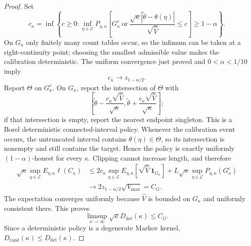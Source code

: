 \documentclass{article}
\begin{document}
\begin{proof}
Set
\[
 c_\kappa=\inf\left\{c\geq0:
  \inf_{\eta\in\mathcal E}P_{\eta,\kappa}\left[
   G_\kappa^c\ \text{or}\
   \frac{\sqrt\kappa|\widetilde\theta-\theta(\eta)|}{\sqrt{\widehat V}}
       \leq c
  \right]\geq1-\alpha
 \right\}.
\]
On \(G_\kappa\) only finitely many count tables occur, so the infimum can
be taken at a right-continuity point; choosing the smallest admissible
value makes the calibration deterministic.  The uniform convergence just
proved and \(0<\alpha<1/10\) imply
\[
 c_\kappa\longrightarrow z_{1-\alpha/2}.
\]
Report \(\Theta\) on \(G_\kappa^c\).  On \(G_\kappa\), report the
intersection of \(\Theta\) with
\[
 \left[\widetilde\theta-\frac{c_\kappa\sqrt{\widehat V}}{\sqrt\kappa},
       \widetilde\theta+\frac{c_\kappa\sqrt{\widehat V}}{\sqrt\kappa}
 \right];
\]
if that intersection is empty, report the nearest endpoint singleton.
This is a Borel deterministic connected-interval policy.  Whenever the
calibration event occurs, the untruncated interval contains
\(\theta(\eta)\in\Theta\), so its intersection is nonempty and still
contains the target.  Hence the policy is exactly uniformly
\((1-\alpha)\)-honest for every \(\kappa\).  Clipping cannot increase
length, and therefore
\[
 \begin{split}
 \sqrt\kappa\sup_{\eta\in\mathcal E}
 E_{\eta,\kappa}\ell(C_\kappa)
 &\leq
 2c_\kappa\sup_{\eta\in\mathcal E}
 E_{\eta,\kappa}\left[\sqrt{\widehat V}\,\mathbf 1_{G_\kappa}\right]
 +L\sqrt\kappa\sup_{\eta\in\mathcal E}P_{\eta,\kappa}(G_\kappa^c)\\
 &\longrightarrow 2z_{1-\alpha/2}\sqrt{V_{\max}}=C_G.
 \end{split}
\]
The expectation converges uniformly because \(\widehat V\) is bounded on
\(G_\kappa\) and uniformly consistent there.  This proves
\[
 \limsup_{\kappa\to\infty}\sqrt\kappa D_{\mathrm{det}}(\kappa)\leq C_G.
\]
Since a deterministic policy is a degenerate Markov kernel,
\(D_{\mathrm{rand}}(\kappa)\leq D_{\mathrm{det}}(\kappa)\).


\end{proof}
\end{document}
